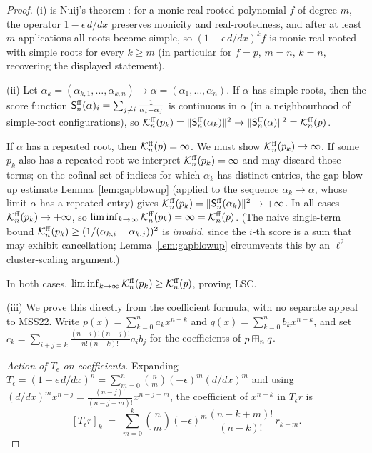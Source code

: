 \begin{proof}
(i) is Nuij's theorem \cite{Nuij}: for a monic real-rooted polynomial $f$ of
degree $m$, the operator $1-\epsilon\,d/dx$ preserves monicity and
real-rootedness, and after at least $m$ applications all roots become simple, so
$(1-\epsilon\,d/dx)^k f$ is monic real-rooted with simple roots for every $k\ge m$
(in particular for $f=p$, $m=n$, $k=n$, recovering the displayed statement).

(ii) Let $\alpha_k=(\alpha_{k,1},\dots,\alpha_{k,n})\to\alpha=(\alpha_1,\dots,\alpha_n)$.
If $\alpha$ has simple roots, then the score function
$\mathsf{S}^{\mathrm{ff}}_n(\alpha)_i=\sum_{j\ne i}\frac{1}{\alpha_i-\alpha_j}$ is continuous in
$\alpha$ (in a neighbourhood of simple-root configurations), so
$\mathcal{K}^{\mathrm{ff}}_n(p_k)=\|\mathsf{S}^{\mathrm{ff}}_n(\alpha_k)\|^2\to\|\mathsf{S}^{\mathrm{ff}}_n(\alpha)\|^2=\mathcal{K}^{\mathrm{ff}}_n(p)$.

If $\alpha$ has a repeated root, then $\mathcal{K}^{\mathrm{ff}}_n(p)=\infty$. We must show
$\mathcal{K}^{\mathrm{ff}}_n(p_k)\to\infty$. If some $p_k$ also has a repeated root we interpret
$\mathcal{K}^{\mathrm{ff}}_n(p_k)=\infty$ and may discard those terms; on the cofinal set of indices
for which $\alpha_k$ has distinct entries, the gap blow-up estimate
Lemma~\ref{lem:gapblowup} (applied to the sequence $\alpha_k\to\alpha$, whose limit
$\alpha$ has a repeated entry) gives $\mathcal{K}^{\mathrm{ff}}_n(p_k)=\|\mathsf{S}^{\mathrm{ff}}_n(\alpha_k)\|^2\to+\infty$.
In all cases $\mathcal{K}^{\mathrm{ff}}_n(p_k)\to+\infty$, so
$\liminf_{k\to\infty}\mathcal{K}^{\mathrm{ff}}_n(p_k)=\infty=\mathcal{K}^{\mathrm{ff}}_n(p)$.
(The naive single-term bound $\mathcal{K}^{\mathrm{ff}}_n(p_k)\ge(1/(\alpha_{k,i}-\alpha_{k,j}))^2$ is
\emph{invalid}, since the $i$-th score is a sum that may exhibit cancellation;
Lemma~\ref{lem:gapblowup} circumvents this by an $\ell^2$ cluster-scaling argument.)

In both cases, $\liminf_{k\to\infty}\mathcal{K}^{\mathrm{ff}}_n(p_k)\ge\mathcal{K}^{\mathrm{ff}}_n(p)$, proving LSC.

(iii) We prove this directly from the coefficient formula, with no separate
appeal to MSS22.  Write $p(x)=\sum_{k=0}^n a_k x^{n-k}$ and
$q(x)=\sum_{k=0}^n b_k x^{n-k}$, and set
$c_k = \sum_{i+j=k}\frac{(n-i)!(n-j)!}{n!(n-k)!}a_i b_j$ for the
coefficients of $p\boxplus_n q$.

\smallskip\noindent\textit{Action of $T_\epsilon$ on coefficients.}
Expanding $T_\epsilon=(1-\epsilon\,d/dx)^n=\sum_{m=0}^n\binom{n}{m}(-\epsilon)^m(d/dx)^m$
and using $(d/dx)^m x^{n-j}=\tfrac{(n-j)!}{(n-j-m)!}x^{n-j-m}$, the
coefficient of $x^{n-k}$ in $T_\epsilon r$ is
\[
[T_\epsilon r]_k
\;=\;\sum_{m=0}^k \binom{n}{m}(-\epsilon)^m\frac{(n{-}k{+}m)!}{(n{-}k)!}\,r_{k-m}.
\]


\end{proof}
